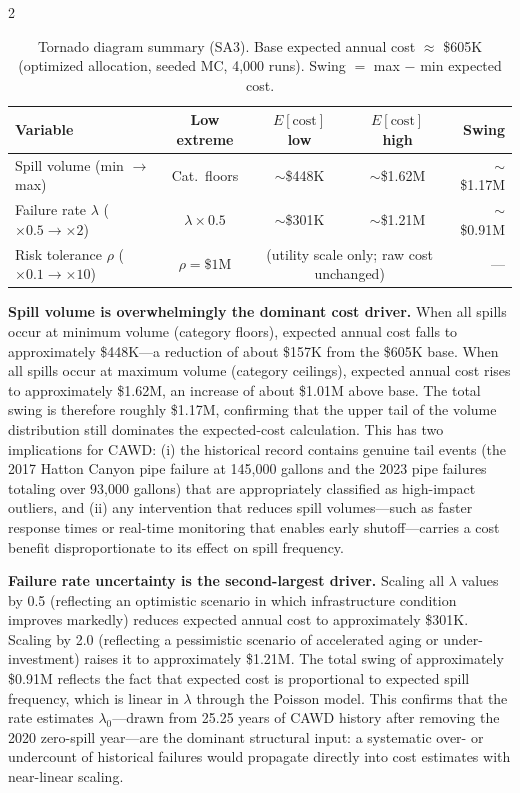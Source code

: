 \documentclass[10pt]{article}
\begin{document}
\begin{multicols}{2}
\begin{table}[!b]
\centering
\caption{Tornado diagram summary (SA3). Base expected annual cost
  $\approx$ \$605K (optimized allocation, seeded MC, 4{,}000 runs).
  Swing $=$ max $-$ min expected cost.}
\label{tab:tornado}
\begin{tabular}{lcccr}
\toprule
\textbf{Variable} & \textbf{Low extreme} & \textbf{$E[\text{cost}]$ low}
  & \textbf{$E[\text{cost}]$ high} & \textbf{Swing} \\
\midrule
Spill volume (min $\to$ max) & Cat.\ floors
  & $\sim$\$448K & $\sim$\$1.62M & $\sim$\$1.17M \\
Failure rate $\lambda$ ($\times 0.5 \to \times 2$) & $\lambda \times 0.5$
  & $\sim$\$301K & $\sim$\$1.21M & $\sim$\$0.91M \\
Risk tolerance $\rho$ ($\times 0.1 \to \times 10$) & $\rho = \$1$M
  & \multicolumn{2}{c}{(utility scale only; raw cost unchanged)} & --- \\
\bottomrule
\end{tabular}
\end{table}

\textbf{Spill volume is overwhelmingly the dominant cost driver.}
When all spills occur at minimum volume (category floors), expected
annual cost falls to approximately \$448K---a reduction of
about \$157K from the \$605K base. When all spills occur at maximum
volume (category ceilings), expected annual cost rises to approximately
\$1.62M, an increase of about \$1.01M above base. The total swing is
therefore roughly \$1.17M, confirming that the upper tail of the
volume distribution still dominates the expected-cost calculation.
This has two implications
for CAWD: (i) the historical record contains genuine tail events
(the 2017 Hatton Canyon pipe failure at 145{,}000 gallons and the
2023 pipe failures totaling over 93{,}000 gallons) that are
appropriately classified as high-impact outliers, and (ii) any
intervention that reduces spill volumes---such as faster response
times or real-time monitoring that enables early shutoff---carries
a cost benefit disproportionate to its effect on spill frequency.

\textbf{Failure rate uncertainty is the second-largest driver.}
Scaling all $\lambda$ values by 0.5 (reflecting an optimistic
scenario in which infrastructure condition improves markedly)
reduces expected annual cost to approximately \$301K. Scaling by 2.0
(reflecting a pessimistic scenario of accelerated aging or
under-investment) raises it to approximately \$1.21M. The total
swing of approximately \$0.91M reflects the fact that expected cost
is proportional to expected spill frequency, which is linear in
$\lambda$ through the Poisson model. This confirms that the rate
estimates $\lambda_0$---drawn from 25.25 years of CAWD history after
removing the 2020 zero-spill year---are the dominant structural
input: a systematic over- or undercount of historical failures would
propagate directly into cost estimates with near-linear scaling.


\end{multicols}
\end{document}
